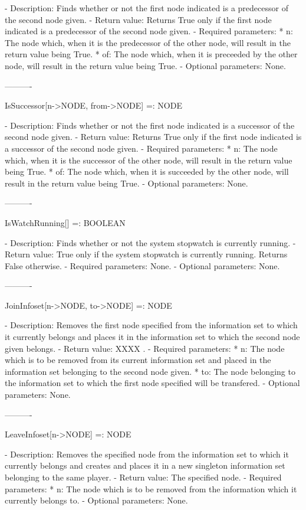    -	Description:  Finds whether or not the first node indicated is a 
	predecessor of the second node given.
   -	Return value:  Returns True only if the first node indicated is a
	predecessor of the second node given.
   -	Required parameters:
	  *  n:  The node which, when it is the predecessor of the other node,
		will result in the return value being True.
	  *  of:  The node which, when it is preceeded by the other node, will
		result in the return value being True.
   -	Optional parameters:  None.

----------

IsSuccessor[n->NODE, from->NODE] =: NODE

   -	Description:  Finds whether or not the first node indicated is a 
	successor of the second node given.
   -	Return value:  Returns True only if the first node indicated is a
	successor of the second node given.
   -	Required parameters:
	  *  n:  The node which, when it is the successor of the other node,
		will result in the return value being True.
	  *  of:  The node which, when it is succeeded by the other node, will
		result in the return value being True.
   -	Optional parameters:  None.

----------

IsWatchRunning[] =: BOOLEAN

   -	Description:  Finds whether or not the system stopwatch is currently
	running.
   -	Return value:  True only if the system stopwatch is currently running.
	Returns False otherwise.
   -	Required parameters:  None.
   -	Optional parameters:  None.

----------

JoinInfoset[n->NODE, to->NODE] =: NODE

   -	Description:  Removes the first node specified from the information set
	to which it currently belongs and places it in the information set to
	which the second node given belongs.
   -	Return value:  XXXX .
   -	Required parameters:
	  *  n:  The node which is to be removed from its current information
		set and placed in the information set belonging to the second
		node given.
	  *  to:  The node belonging to the information set to which the first
		node specified will be transfered.
   -	Optional parameters:  None.

----------

LeaveInfoset[n->NODE] =: NODE

   -	Description:  Removes the specified node from the information set to
	which it currently belongs and creates and places it in a new singleton
	information set belonging to the same player.
   -	Return value:  The specified node.
   -	Required parameters:
	  *  n:  The node which is to be removed from the information which it
		currently belongs to.
   -	Optional parameters:  None.

